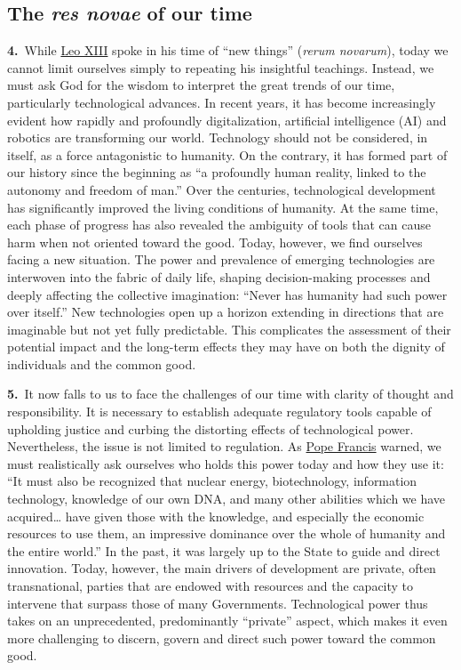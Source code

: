 \documentclass{article}
\begin{document}
\subsection{The \emph{res novae} of our time}

\textbf{4.}\ While \href{https://www.vatican.va/content/leo-xiii/en.html}{Leo XIII} spoke in his time of ``new things'' (\emph{rerum novarum}), today we cannot limit ourselves simply to repeating his insightful teachings. Instead, we must ask God for the wisdom to interpret the great trends of our time, particularly technological advances. In recent years, it has become increasingly evident how rapidly and profoundly digitalization, artificial intelligence (AI) and robotics are transforming our world. Technology should not be considered, in itself, as a force antagonistic to humanity. On the contrary, it has formed part of our history since the beginning as ``a profoundly human reality, linked to the autonomy and freedom of man.''\cite{n5} Over the centuries, technological development has significantly improved the living conditions of humanity. At the same time, each phase of progress has also revealed the ambiguity of tools that can cause harm when not oriented toward the good. Today, however, we find ourselves facing a new situation. The power and prevalence of emerging technologies are interwoven into the fabric of daily life, shaping decision-making processes and deeply affecting the collective imagination: ``Never has humanity had such power over itself.''\cite{n6} New technologies open up a horizon extending in directions that are imaginable but not yet fully predictable. This complicates the assessment of their potential impact and the long-term effects they may have on both the dignity of individuals and the common good.

\textbf{5.}\ It now falls to us to face the challenges of our time with clarity of thought and responsibility. It is necessary to establish adequate regulatory tools capable of upholding justice and curbing the distorting effects of technological power. Nevertheless, the issue is not limited to regulation. As \href{https://www.vatican.va/content/francesco/en.html}{Pope Francis} warned, we must realistically ask ourselves who holds this power today and how they use it: ``It must also be recognized that nuclear energy, biotechnology, information technology, knowledge of our own DNA, and many other abilities which we have acquired\dots{} have given those with the knowledge, and especially the economic resources to use them, an impressive dominance over the whole of humanity and the entire world.''\cite{n7} In the past, it was largely up to the State to guide and direct innovation. Today, however, the main drivers of development are private, often transnational, parties that are endowed with resources and the capacity to intervene that surpass those of many Governments. Technological power thus takes on an unprecedented, predominantly ``private'' aspect, which makes it even more challenging to discern, govern and direct such power toward the common good.
\end{document}
